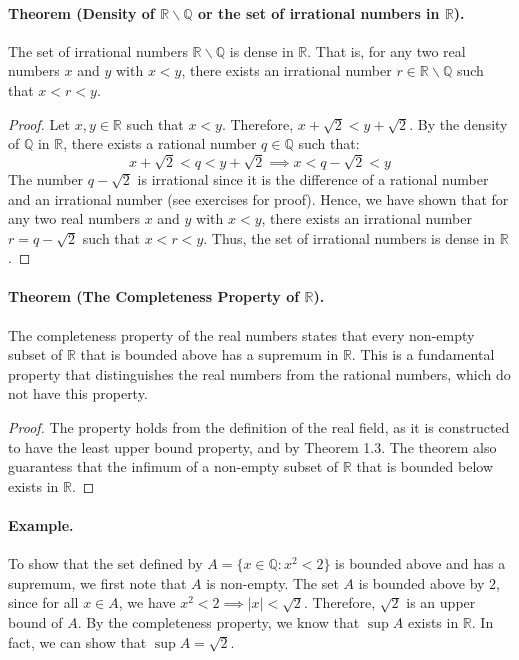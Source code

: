 \documentclass[openany]{book}
\numberwithin{equation}{section}
\begin{document}
\paragraph{Theorem (Density of $\mathbb{R} \backslash \mathbb{Q}$ or the set of irrational numbers in $\mathbb{R}$).}

The set of irrational numbers $\mathbb{R} \backslash \mathbb{Q}$ is dense in $\mathbb{R}$. That is, for any two real numbers $x$ and $y$ with $x < y$, there exists an irrational number $r \in \mathbb{R} \backslash \mathbb{Q}$ such that $x < r < y$.
\par
\begin{proof}
Let $x, y \in \mathbb{R}$ such that $x < y$. Therefore, $x + \sqrt{2} < y + \sqrt{2}$. By the density of $\mathbb{Q}$ in $\mathbb{R}$, there exists a rational number $q \in \mathbb{Q}$ such that: 
$$x + \sqrt{2} < q < y + \sqrt{2} \implies x < q - \sqrt{2} < y$$
The number $q - \sqrt{2}$ is irrational since it is the difference of a rational number and an irrational number (see exercises for proof). Hence, we have shown that for any two real numbers $x$ and $y$ with $x < y$, there exists an irrational number $r = q - \sqrt{2}$ such that $x < r < y$. Thus, the set of irrational numbers is dense in $\mathbb{R}$.
\end{proof} 
\paragraph{Theorem (The Completeness Property of $\mathbb{R}$).}

The completeness property of the real numbers states that every non-empty subset of $\mathbb{R}$ that is bounded above has a supremum in $\mathbb{R}$. This is a fundamental property that distinguishes the real numbers from the rational numbers, which do not have this property. 
\par
\begin{proof}
The property holds from the definition of the real field, as it is constructed to have the least upper bound property, and by Theorem 1.3. The theorem also guarantess that the infimum of a non-empty subset of $\mathbb{R}$ that is bounded below exists in $\mathbb{R}$.
\end{proof}
\paragraph{Example.}

To show that the set defined by $A = \{x \in \mathbb{Q}: x^2 < 2\}$ is bounded above and has a supremum, we first note that $A$ is non-empty. The set $A$ is bounded above by $2$, since for all $x \in A$, we have $x^2 < 2 \implies |x| < \sqrt{2}$. Therefore, $\sqrt{2}$ is an upper bound of $A$. By the completeness property, we know that $\sup A$ exists in $\mathbb{R}$. In fact, we can show that $\sup A = \sqrt{2}$.
\par
\end{document}

